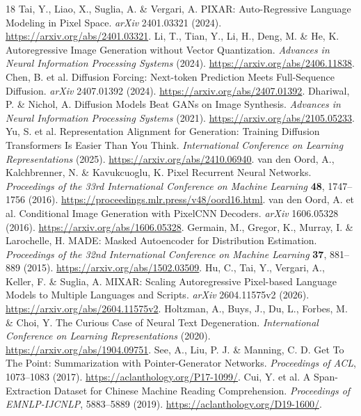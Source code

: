 \documentclass[10pt,a4paper]{article}
\begin{document}
\begin{thebibliography}{18}
\small
{}
 Tai, Y., Liao, X., Suglia, A. \& Vergari, A. PIXAR: Auto-Regressive Language Modeling in Pixel Space. \emph{arXiv} 2401.03321 (2024). \url{https://arxiv.org/abs/2401.03321}.
 Li, T., Tian, Y., Li, H., Deng, M. \& He, K. Autoregressive Image Generation without Vector Quantization. \emph{Advances in Neural Information Processing Systems} (2024). \url{https://arxiv.org/abs/2406.11838}.
 Chen, B. et al. Diffusion Forcing: Next-token Prediction Meets Full-Sequence Diffusion. \emph{arXiv} 2407.01392 (2024). \url{https://arxiv.org/abs/2407.01392}.
 Dhariwal, P. \& Nichol, A. Diffusion Models Beat GANs on Image Synthesis. \emph{Advances in Neural Information Processing Systems} (2021). \url{https://arxiv.org/abs/2105.05233}.
 Yu, S. et al. Representation Alignment for Generation: Training Diffusion Transformers Is Easier Than You Think. \emph{International Conference on Learning Representations} (2025). \url{https://arxiv.org/abs/2410.06940}.
 van den Oord, A., Kalchbrenner, N. \& Kavukcuoglu, K. Pixel Recurrent Neural Networks. \emph{Proceedings of the 33rd International Conference on Machine Learning} \textbf{48}, 1747--1756 (2016). \url{https://proceedings.mlr.press/v48/oord16.html}.
 van den Oord, A. et al. Conditional Image Generation with PixelCNN Decoders. \emph{arXiv} 1606.05328 (2016). \url{https://arxiv.org/abs/1606.05328}.
 Germain, M., Gregor, K., Murray, I. \& Larochelle, H. MADE: Masked Autoencoder for Distribution Estimation. \emph{Proceedings of the 32nd International Conference on Machine Learning} \textbf{37}, 881--889 (2015). \url{https://arxiv.org/abs/1502.03509}.
 Hu, C., Tai, Y., Vergari, A., Keller, F. \& Suglia, A. MIXAR: Scaling Autoregressive Pixel-based Language Models to Multiple Languages and Scripts. \emph{arXiv} 2604.11575v2 (2026). \url{https://arxiv.org/abs/2604.11575v2}.
 Holtzman, A., Buys, J., Du, L., Forbes, M. \& Choi, Y. The Curious Case of Neural Text Degeneration. \emph{International Conference on Learning Representations} (2020). \url{https://arxiv.org/abs/1904.09751}.
 See, A., Liu, P. J. \& Manning, C. D. Get To The Point: Summarization with Pointer-Generator Networks. \emph{Proceedings of ACL}, 1073--1083 (2017). \url{https://aclanthology.org/P17-1099/}.
 Cui, Y. et al. A Span-Extraction Dataset for Chinese Machine Reading Comprehension. \emph{Proceedings of EMNLP-IJCNLP}, 5883--5889 (2019). \url{https://aclanthology.org/D19-1600/}.

\end{thebibliography}
\end{document}
